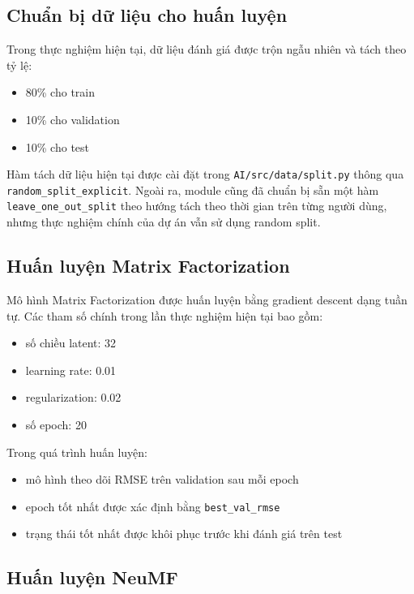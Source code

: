 \documentclass[12pt,a4paper]{article}
\begin{document}
\subsection{Chuẩn bị dữ liệu cho huấn luyện}

Trong thực nghiệm hiện tại, dữ liệu đánh giá được trộn ngẫu nhiên và tách theo tỷ lệ:

\begin{itemize}[leftmargin=1.5cm]
    \item 80\% cho train
    \item 10\% cho validation
    \item 10\% cho test
\end{itemize}

Hàm tách dữ liệu hiện tại được cài đặt trong \texttt{AI/src/data/split.py} thông qua \texttt{random\_split\_explicit}. Ngoài ra, module cũng đã chuẩn bị sẵn một hàm \texttt{leave\_one\_out\_split} theo hướng tách theo thời gian trên từng người dùng, nhưng thực nghiệm chính của dự án vẫn sử dụng random split.

\subsection{Huấn luyện Matrix Factorization}

Mô hình Matrix Factorization được huấn luyện bằng gradient descent dạng tuần tự. Các tham số chính trong lần thực nghiệm hiện tại bao gồm:

\begin{itemize}[leftmargin=1.5cm]
    \item số chiều latent: 32
    \item learning rate: 0.01
    \item regularization: 0.02
    \item số epoch: 20
\end{itemize}

Trong quá trình huấn luyện:

\begin{itemize}[leftmargin=1.5cm]
    \item mô hình theo dõi RMSE trên validation sau mỗi epoch
    \item epoch tốt nhất được xác định bằng \texttt{best\_val\_rmse}
    \item trạng thái tốt nhất được khôi phục trước khi đánh giá trên test
\end{itemize}

\subsection{Huấn luyện NeuMF}
\end{document}
